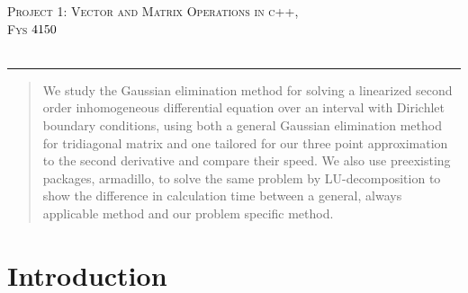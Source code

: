 \documentclass[a4paper,11pt]{article}
\newcommand*{\boisik}{\fontfamily{bsk}\selectfont} %
\begin{document}
{
\SetBgVshift{-1.2cm}
\SetBgHshift{-10.5cm}
$$\:$$
\begin{center}
	\vspace{0.2cm}%
	\fontsize{15}{15}\selectfont \textsc{ Project 1: Vector and Matrix Operations in c++},\\
	\fontsize{13}{13}\selectfont \textsc{Fys $\textnormal{{4150}}$ }\\
	\vspace{0.4cm}
	\fontsize{12}{12}\\
	\vspace{0.5cm}
\end{center}
	
\rule{\textwidth}{0.3pt}\par
		
\begin{abstract}
	We study the Gaussian elimination method for solving a linearized second order inhomogeneous differential equation over an interval with Dirichlet boundary conditions, using both a general Gaussian elimination method for tridiagonal matrix and one tailored for our three point approximation to the second derivative and compare their speed. We also use preexisting packages, armadillo, to solve the same problem by LU-decomposition to show the difference in calculation time between a general, always applicable method and our problem specific method.
\end{abstract}



		
\section*{Introduction}
		
}
\end{document}
